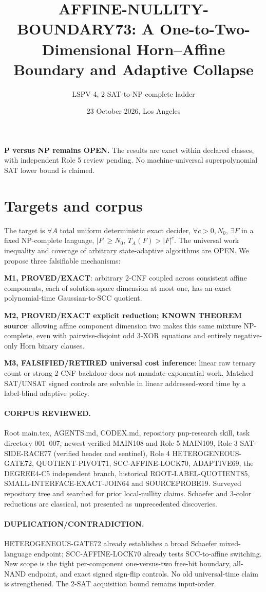 \documentclass[11pt]{article}
\title{AFFINE-NULLITY-BOUNDARY73: A One-to-Two-Dimensional Horn--Affine Boundary and Adaptive Collapse}
\author{LSPV-4, 2-SAT-to-NP-complete ladder}
\date{23 October 2026, Los Angeles}
\begin{document}
\maketitle
\begin{center}\textbf{P versus NP remains OPEN.} The results are exact within declared classes, with independent Role 5 review pending. No machine-universal superpolynomial SAT lower bound is claimed.\end{center}
\section{Targets and corpus}
The target is $\forall A$ total uniform deterministic exact decider, $\forall c>0,N_0$, $\exists F$ in a fixed NP-complete language, $|F|\ge N_0$, $T_A(F)>|F|^c$. The universal work inequality and coverage of arbitrary state-adaptive algorithms are OPEN. We propose three falsifiable mechanisms:
\par\noindent \textbf{M1, PROVED/EXACT}: arbitrary 2-CNF coupled across consistent affine components, each of solution-space dimension at most one, has an exact polynomial-time Gaussian-to-SCC quotient.
\par\noindent \textbf{M2, PROVED/EXACT explicit reduction; KNOWN THEOREM source}: allowing affine component dimension two makes this same mixture NP-complete, even with pairwise-disjoint odd 3-XOR equations and entirely negative-only Horn binary clauses.
\par\noindent \textbf{M3, FALSIFIED/RETIRED universal cost inference}: linear raw ternary count or strong 2-CNF backdoor does not mandate exponential work. Matched SAT/UNSAT signed controls are solvable in linear addressed-word time by a label-blind adaptive policy.
\paragraph{CORPUS REVIEWED.} Root main.tex, AGENTS.md, CODEX.md, repository pnp-research skill, task directory 001--007, newest verified MAIN108 and Role 5 MAIN109, Role 3 SAT-SIDE-RACE77 (verified header and sentinel), Role 4 HETEROGENEOUS-GATE72, QUOTIENT-PIVOT71, SCC-AFFINE-LOCK70, ADAPTIVE69, the DEGREE4-C5 independent branch, historical ROOT-LABEL-QUOTIENT85, SMALL-INTERFACE-EXACT-JOIN64 and SOURCEPROBE19. Surveyed repository tree and searched for prior local-nullity claims. Schaefer and 3-color reductions are classical, not presented as unprecedented discoveries.
\paragraph{DUPLICATION/CONTRADICTION.} HETEROGENEOUS-GATE72 already establishes a broad Schaefer mixed-language endpoint; SCC-AFFINE-LOCK70 already tests SCC-to-affine switching. New scope is the tight per-component one-versus-two free-bit boundary, all-NAND endpoint, and exact signed sign-flip controls. No old universal-time claim is strengthened. The 2-SAT acquisition bound remains input-order.
\end{document}
